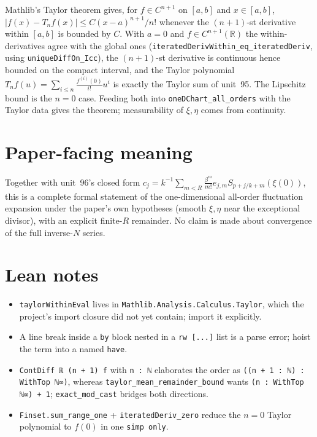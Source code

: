 \documentclass[11pt]{article}
\begin{document}
Mathlib's Taylor theorem gives, for $f\in C^{n+1}$ on $[a,b]$ and $x\in[a,b]$,
$|f(x)-T_n f(x)|\le C(x-a)^{n+1}/n!$ whenever the $(n+1)$-st derivative within $[a,b]$ is bounded by
$C$. With $a=0$ and $f\in C^{n+1}(\mathbb R)$ the within-derivatives agree with the global ones
(\texttt{iteratedDerivWithin\_eq\_iteratedDeriv}, using \texttt{uniqueDiffOn\_Icc}), the
$(n+1)$-st derivative is continuous hence bounded on the compact interval, and the Taylor polynomial
$T_nf(u)=\sum_{i\le n}\frac{f^{(i)}(0)}{i!}u^i$ is exactly the Taylor sum of unit~95. The Lipschitz
bound is the $n=0$ case. Feeding both into \texttt{oneDChart\_all\_orders} with the Taylor data
gives the theorem; measurability of $\xi,\eta$ comes from continuity.

\section{Paper-facing meaning}

Together with unit~96's closed form
$c_j=k^{-1}\sum_{m<R}\frac{\beta^m}{m!}e_{j,m}S_{p+j/k+m}(\xi(0))$, this is a complete formal
statement of the one-dimensional all-order fluctuation expansion under the paper's own hypotheses
(smooth $\xi,\eta$ near the exceptional divisor), with an explicit finite-$R$ remainder. No claim is
made about convergence of the full inverse-$N$ series.

\section{Lean notes}

\begin{itemize}
\item \texttt{taylorWithinEval} lives in \texttt{Mathlib.Analysis.Calculus.Taylor}, which the
project's import closure did not yet contain; import it explicitly.
\item A line break inside a \texttt{by} block nested in a \texttt{rw [...]} list is a parse error;
hoist the term into a named \texttt{have}.
\item \texttt{ContDiff ℝ (n + 1) f} with \texttt{n : ℕ} elaborates the order as
\texttt{((n + 1 : ℕ) : WithTop ℕ∞)}, whereas \texttt{taylor\_mean\_remainder\_bound} wants
\texttt{(n : WithTop ℕ∞) + 1}; \texttt{exact\_mod\_cast} bridges both directions.
\item \texttt{Finset.sum\_range\_one} + \texttt{iteratedDeriv\_zero} reduce the $n=0$ Taylor
polynomial to $f(0)$ in one \texttt{simp only}.
\end{itemize}
\end{document}
